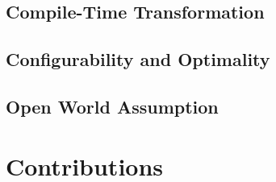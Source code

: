 


\subsection{Compile-Time Transformation}

\subsection{Configurability and Optimality}

\subsection{Open World Assumption}


\section{Contributions}
